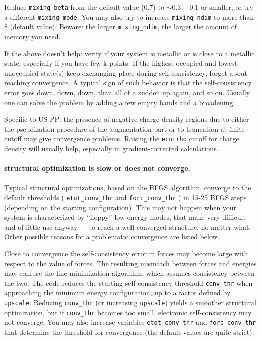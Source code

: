 \documentclass[12pt,a4paper]{article}
\begin{document}
Reduce \texttt{mixing\_beta} from the default value (0.7) to $\sim
0.3-0.1$ or smaller, or try a different \texttt{mixing\_mode}.
You may also try to increase \texttt{mixing\_ndim} to more than 8
(default value).
Beware: the larger \texttt{mixing\_ndim}, the larger the amount of
memory you need.

If the above doesn't help: verify if your system is metallic or is
close to a metallic state, especially if you have few k-points.
If the highest occupied and lowest unoccupied state(s) keep exchanging
place during self-consistency, forget about reaching convergence. A 
typical sign of such behavior is that the self-consistency error 
goes down, down, down, than all of a sudden up again, and so on.
Usually one can solve the problem by adding a few empty bands and a
broadening.

Specific to US PP: the presence of negative charge density regions due
to either the pseudization procedure of the augmentation part or to
truncation at finite cutoff may give convergence problems.
Raising the \texttt{ecutrho} cutoff for charge density will usually
help, especially in gradient-corrected calculations.

\paragraph{structural optimization is slow or does not converge.}

Typical structural optimizations, based on the BFGS algorithm, converge to 
the default thresholds ( \texttt{etot\_conv\_thr} and 
\texttt{forc\_conv\_thr} ) in 15-25 BFGS steps (depending on the starting 
configuration). This may not happen when your system is characterized by 
``floppy'' low-energy modes, that make very difficult --- and of little use 
anyway --- to reach a well converged structure, no matter what.  Other 
possible reasons for a problematic convergence are listed below.

Close to convergence the self-consistency error in forces may become
large with respect to the value of forces.  The resulting mismatch
between forces and energies may confuse the line minimization
algorithm, which assumes consistency between the two.  The code
reduces the starting self-consistency threshold
\texttt{conv\_thr} when approaching the minimum energy configuration,
up to a factor defined by \texttt{upscale}.  Reducing
\texttt{conv\_thr} (or increasing \texttt{upscale}) yields a smoother
structural optimization, but if \texttt{conv\_thr} becomes too small,
electronic self-consistency may not converge.  You may also increase
variables \texttt{etot\_conv\_thr} and
\texttt{forc\_conv\_thr} that determine the threshold for convergence
(the default values are quite strict).
\end{document}
